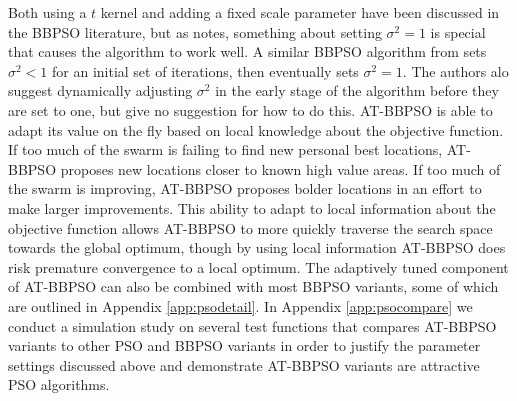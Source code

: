 \documentclass[cmbright]{staauth}
\begin{document}
Both using a $t$ kernel and adding a fixed scale parameter have been discussed in the BBPSO literature, but as \citet{kennedy2003bare} notes, something about setting $\sigma^2=1$ is special that causes the algorithm to work well. A similar BBPSO algorithm from \citet{hsieh2010modified} sets $\sigma^2<1$ for an initial set of iterations, then eventually sets $\sigma^2=1$. The authors alo suggest dynamically adjusting $\sigma^2$ in the early stage of the algorithm before they are set to one, but give no suggestion for how to do this. AT-BBPSO is able to adapt its value on the fly based on local knowledge about the objective function. If too much of the swarm is failing to find new personal best locations, AT-BBPSO proposes new locations closer to known high value areas. If too much of the swarm is improving, AT-BBPSO proposes bolder locations in an effort to make larger improvements. This ability to adapt to local information about the objective function allows AT-BBPSO to more quickly traverse the search space towards the global optimum, though by using local information AT-BBPSO does risk premature convergence to a local optimum. The adaptively tuned component of AT-BBPSO can also be combined with most BBPSO variants, some of which are outlined in Appendix \ref{app:psodetail}. In Appendix \ref{app:psocompare} we conduct a simulation study on several test functions that compares AT-BBPSO variants to other PSO and BBPSO variants in order to justify the parameter settings discussed above and demonstrate AT-BBPSO variants are attractive PSO algorithms.
\end{document}
